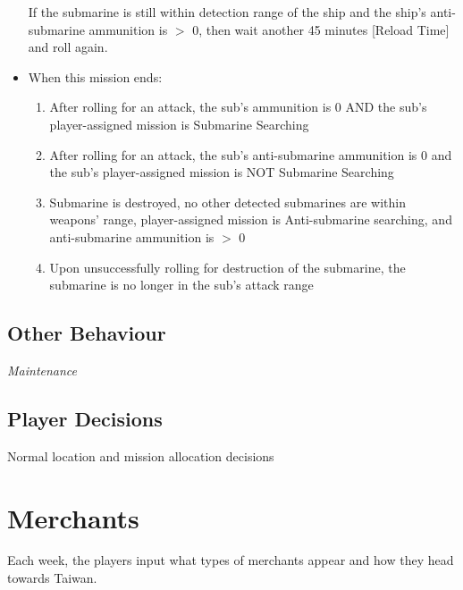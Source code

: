 \documentclass{article}
\begin{document}
\begin{itemize}
                If the submarine is still within detection range of the ship and the ship's anti-submarine ammunition is $>$ 0, then wait another 45 minutes [Reload Time] and roll again.
            \item{When this mission ends:}
                \begin{enumerate}[label=\arabic*)]
                    \item After rolling for an attack, the sub's ammunition is 0 AND the sub's player-assigned mission is Submarine Searching \par
                    [Sub's mission becomes Transit to Base]
                    \item After rolling for an attack, the sub's anti-submarine ammunition is 0 and the sub's player-assigned mission is NOT Submarine Searching \par
                    [Ship resumes player-assigned mission]
                    \item Submarine is destroyed, no other detected submarines are within weapons' range, player-assigned mission is Anti-submarine searching, and anti-submarine ammunition is $>$ 0\par
                    [Sub's mission becomes Antisubmarine searching]
                    \item Upon unsuccessfully rolling for destruction of the submarine, the submarine is no longer in the sub's attack range\par
                    [Ship resumes player-assigned mission]
                \end{enumerate}
            \end{itemize}

\subsection{Other Behaviour}
    \noindent \textit{Maintenance}

\subsection{Player Decisions}

    Normal location and mission allocation decisions 

\section{Merchants}

Each week, the players input what types of merchants appear and how they head towards Taiwan.
\end{document}
